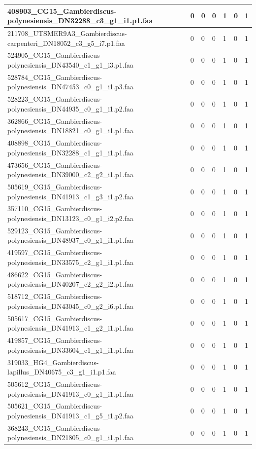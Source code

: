 \documentclass[12pt]{article}
\begin{document}
\begin{longtable}{ | p{2cm} | p{2cm} |p{2.5cm} | p{2cm} | p{2.5cm} |  p{2cm} | p{2cm} |}
 \hline 
408903\_CG15\_Gambierdiscus-polynesiensis\_DN32288\_c3\_g1\_i1.p1.faa&0&0&0&1&0&1\\ 
 \hline 
211708\_UTSMER9A3\_Gambierdiscus-carpenteri\_DN18052\_c3\_g5\_i7.p1.faa&0&0&0&1&0&1\\ 
 \hline 
524905\_CG15\_Gambierdiscus-polynesiensis\_DN43540\_c1\_g1\_i3.p1.faa&0&0&0&1&0&1\\ 
 \hline 
528784\_CG15\_Gambierdiscus-polynesiensis\_DN47453\_c0\_g1\_i1.p3.faa&0&0&0&1&0&1\\ 
 \hline 
528223\_CG15\_Gambierdiscus-polynesiensis\_DN44935\_c0\_g1\_i1.p2.faa&0&0&0&1&0&1\\ 
 \hline 
362866\_CG15\_Gambierdiscus-polynesiensis\_DN18821\_c0\_g1\_i1.p1.faa&0&0&0&1&0&1\\ 
 \hline 
408898\_CG15\_Gambierdiscus-polynesiensis\_DN32288\_c1\_g1\_i1.p1.faa&0&0&0&1&0&1\\ 
 \hline 
473656\_CG15\_Gambierdiscus-polynesiensis\_DN39000\_c2\_g2\_i1.p1.faa&0&0&0&1&0&1\\ 
 \hline 
505619\_CG15\_Gambierdiscus-polynesiensis\_DN41913\_c1\_g3\_i1.p2.faa&0&0&0&1&0&1\\ 
 \hline 
357110\_CG15\_Gambierdiscus-polynesiensis\_DN13123\_c0\_g1\_i2.p2.faa&0&0&0&1&0&1\\ 
 \hline 
529123\_CG15\_Gambierdiscus-polynesiensis\_DN48937\_c0\_g1\_i1.p1.faa&0&0&0&1&0&1\\ 
 \hline 
419597\_CG15\_Gambierdiscus-polynesiensis\_DN33575\_c2\_g1\_i1.p1.faa&0&0&0&1&0&1\\ 
 \hline 
486622\_CG15\_Gambierdiscus-polynesiensis\_DN40207\_c2\_g2\_i2.p1.faa&0&0&0&1&0&1\\ 
 \hline 
518712\_CG15\_Gambierdiscus-polynesiensis\_DN43045\_c0\_g2\_i6.p1.faa&0&0&0&1&0&1\\ 
 \hline 
505617\_CG15\_Gambierdiscus-polynesiensis\_DN41913\_c1\_g2\_i1.p1.faa&0&0&0&1&0&1\\ 
 \hline 
419857\_CG15\_Gambierdiscus-polynesiensis\_DN33604\_c1\_g1\_i1.p1.faa&0&0&0&1&0&1\\ 
 \hline 
319033\_HG4\_Gambierdiscus-lapillus\_DN40675\_c3\_g1\_i1.p1.faa&0&0&0&1&0&1\\ 
 \hline 
505612\_CG15\_Gambierdiscus-polynesiensis\_DN41913\_c0\_g1\_i1.p1.faa&0&0&0&1&0&1\\ 
 \hline 
505621\_CG15\_Gambierdiscus-polynesiensis\_DN41913\_c1\_g5\_i1.p2.faa&0&0&0&1&0&1\\ 
 \hline 
368243\_CG15\_Gambierdiscus-polynesiensis\_DN21805\_c0\_g1\_i1.p1.faa&0&0&0&1&0&1\\ 

\end{longtable}
\end{document}
